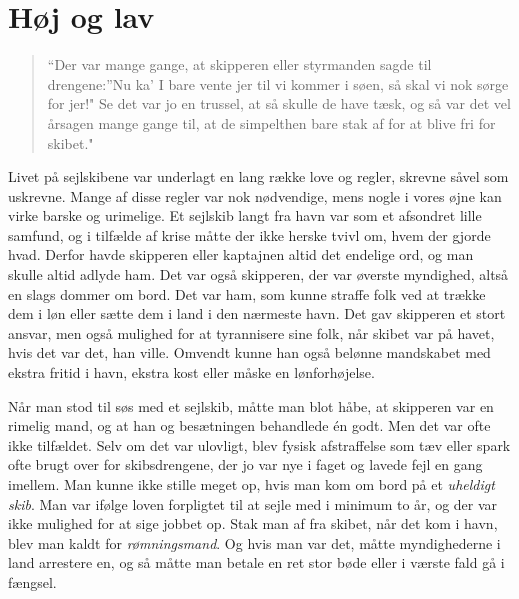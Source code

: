 \chapter{Høj og lav}\label{huxf8j-og-lav}

\begin{quote}
``Der var mange gange, at skipperen eller styrmanden sagde til
drengene:''Nu ka' I bare vente jer til vi kommer i søen, så skal vi nok
sørge for jer!" Se det var jo en trussel, at så skulle de have tæsk, og
så var det vel årsagen mange gange til, at de simpelthen bare stak af
for at blive fri for skibet."
\end{quote}

Livet på sejlskibene var underlagt en lang række love og regler, skrevne
såvel som uskrevne. Mange af disse regler var nok nødvendige, mens nogle
i vores øjne kan virke barske og urimelige. Et sejlskib langt fra havn
var som et afsondret lille samfund, og i tilfælde af krise måtte der
ikke herske tvivl om, hvem der gjorde hvad. Derfor havde skipperen eller
kaptajnen altid det endelige ord, og man skulle altid adlyde ham. Det
var også skipperen, der var øverste myndighed, altså en slags dommer om
bord. Det var ham, som kunne straffe folk ved at trække dem i løn eller
sætte dem i land i den nærmeste havn. Det gav skipperen et stort ansvar,
men også mulighed for at tyrannisere sine folk, når skibet var på havet,
hvis det var det, han ville. Omvendt kunne han også belønne mandskabet
med ekstra fritid i havn, ekstra kost eller måske en lønforhøjelse.

Når man stod til søs med et sejlskib, måtte man blot håbe, at skipperen
var en rimelig mand, og at han og besætningen behandlede én godt. Men
det var ofte ikke tilfældet. Selv om det var ulovligt, blev fysisk
afstraffelse som tæv eller spark ofte brugt over for skibsdrengene, der
jo var nye i faget og lavede fejl en gang imellem. Man kunne ikke stille
meget op, hvis man kom om bord på et \emph{uheldigt skib}. Man var
ifølge loven forpligtet til at sejle med i minimum to år, og der var
ikke mulighed for at sige jobbet op. Stak man af fra skibet, når det kom
i havn, blev man kaldt for \emph{rømningsmand}. Og hvis man var det,
måtte myndighederne i land arrestere en, og så måtte man betale en ret
stor bøde eller i værste fald gå i fængsel.

